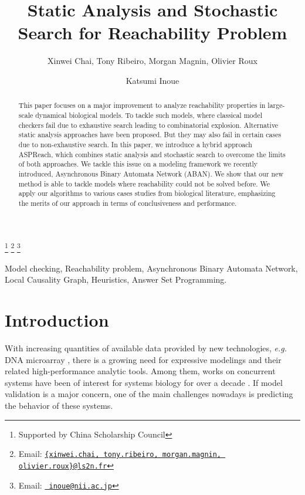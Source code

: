 \documentclass{entcs}
\begin{document}
\begin{frontmatter}
    \title{Static Analysis and Stochastic Search for Reachability Problem} 
    \author{Xinwei Chai, Tony Ribeiro, Morgan Magnin, Olivier Roux}
    \address{Laboratoire des Sciences du Numérique de Nantes
            \\ 1 Rue de la No\"e 44300 Nantes, France}
    \author{Katsumi Inoue}
    \address{National Institute of Informatics\\ 
            2-1-2 Hitotsubashi, Chiyoda-ku, Tokyo 101-8430, Japan} 
    \thanks[ALL]{Supported by China Scholarship Council} 
    \thanks[myemail]{Email: \href{mailto:myuserid@mydept.myinst.myedu} {\texttt{\normalshape \{xinwei.chai, tony.ribeiro, morgan.magnin, olivier.roux\}@ls2n.fr}}}
    \thanks[coemail]{Email: \href{mailto:couserid@codept.coinst.coedu} {\texttt{\normalshape
        inoue@nii.ac.jp}}}
\begin{abstract} 
This paper focuses on a major improvement to analyze reachability properties in large-scale dynamical biological models. 
To tackle such models, where classical model checkers fail due to exhaustive search leading to combinatorial explosion.
Alternative static analysis approaches have been proposed. 
But they may also fail in certain cases due to non-exhaustive search.
In this paper, we introduce a hybrid approach ASPReach, which combines static analysis and stochastic search to overcome the limits of both approaches.
We tackle this issue on a modeling framework we recently introduced, Asynchronous Binary Automata Network (ABAN). 
We show that our new method is able to tackle models where reachability could not be solved before.
We apply our algorithms to various cases studies from biological literature, emphasizing the merits of our approach in terms of conclusiveness and performance.
\end{abstract}
\begin{keyword}
Model checking, Reachability problem, Asynchronous Binary Automata Network, Local Causality Graph, Heuristics, Answer Set Programming.
\end{keyword}
\end{frontmatter}
\section{Introduction}\label{intro}
With increasing quantities of available data provided by new technologies, \textit{e.g.} DNA microarray \cite{marx2013}, there is a growing need for expressive modelings and their related high-performance analytic tools. 
Among them, works on concurrent systems have been of interest for systems biology for over a decade \cite{bockmayr2002using,bortolussi2008modeling,wiley2003computational}. 
If model validation is a major concern, one of the main challenges nowadays is predicting the behavior of these systems. 
\end{document}
